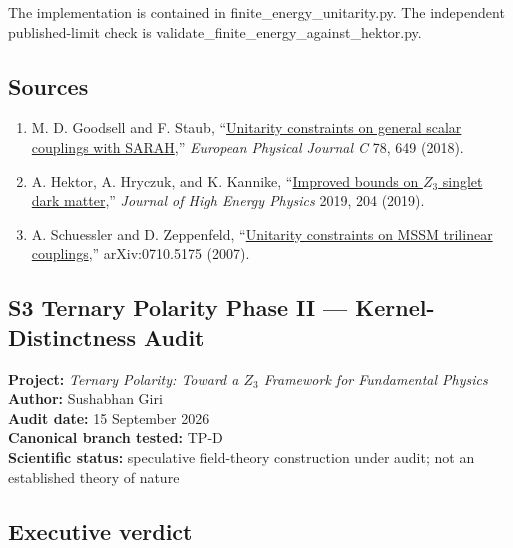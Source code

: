 \documentclass[
]{article}
\providecommand{\tightlist}{%
  \setlength{\itemsep}{0pt}\setlength{\parskip}{0pt}}
\begin{document}
The implementation is contained in finite\_energy\_unitarity.py. The
independent published-limit check is
validate\_finite\_energy\_against\_hektor.py.

\hypertarget{sources-1}{%
\subsection{Sources}\label{sources-1}}

\begin{enumerate}
\def\labelenumi{\arabic{enumi}.}
\tightlist
\item
  M. D. Goodsell and F. Staub,
  ``\href{https://doi.org/10.1140/epjc/s10052-018-6127-z}{Unitarity
  constraints on general scalar couplings with SARAH},'' \emph{European
  Physical Journal C} 78, 649 (2018).
\item
  A. Hektor, A. Hryczuk, and K. Kannike,
  ``\href{https://doi.org/10.1007/JHEP03(2019)204}{Improved bounds on
  \(Z_3\) singlet dark matter},'' \emph{Journal of High Energy Physics}
  2019, 204 (2019).
\item
  A. Schuessler and D. Zeppenfeld,
  ``\href{https://arxiv.org/abs/0710.5175}{Unitarity constraints on MSSM
  trilinear couplings},'' arXiv:0710.5175 (2007).
\end{enumerate}

\newpage

\hypertarget{s3-ternary-polarity-phase-ii-kernel-distinctness-audit}{%
\subsection{S3 Ternary Polarity Phase II --- Kernel-Distinctness
Audit}\label{s3-ternary-polarity-phase-ii-kernel-distinctness-audit}}

\textbf{Project:} \emph{Ternary Polarity: Toward a \(Z_3\) Framework for
Fundamental Physics}\\
\textbf{Author:} Sushabhan Giri\\
\textbf{Audit date:} 15 September 2026\\
\textbf{Canonical branch tested:} TP-D\\
\textbf{Scientific status:} speculative field-theory construction under
audit; not an established theory of nature

\hypertarget{executive-verdict}{%
\subsection{Executive verdict}\label{executive-verdict}}
\end{document}
